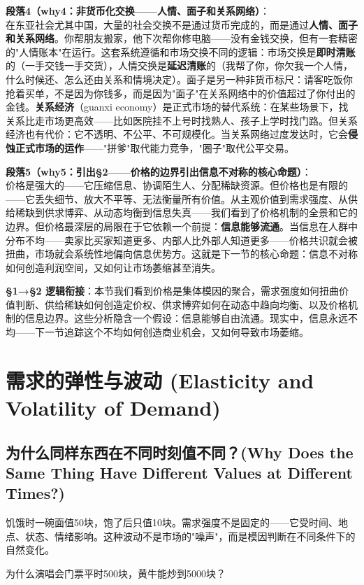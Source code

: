 \documentclass[../main.tex]{subfiles}
\begin{document}
	\textbf{段落4（why4：非货币化交换——人情、面子和关系网络）}：\\
	在东亚社会尤其中国，大量的社会交换不是通过货币完成的，而是通过\textbf{人情、面子和关系网络}。你帮朋友搬家，他下次帮你修电脑——没有金钱交换，但有一套精密的"人情账本"在运行。这套系统遵循和市场交换不同的逻辑：市场交换是\textbf{即时清账}的（一手交钱一手交货），人情交换是\textbf{延迟清账}的（我帮了你，你欠我一个人情，什么时候还、怎么还由关系和情境决定）。面子是另一种非货币标尺：请客吃饭你抢着买单，不是因为你钱多，而是因为"面子"在关系网络中的价值超过了你付出的金钱。\textbf{关系经济}（guanxi economy）是正式市场的替代系统：在某些场景下，找关系比走市场更高效——比如医院挂不上号时找熟人、孩子上学时找门路。但关系经济也有代价：它不透明、不公平、不可规模化。当关系网络过度发达时，它会\textbf{侵蚀正式市场的运作}——"拼爹"取代能力竞争，"圈子"取代公平交易。

	\textbf{段落5（why5：引出§2——价格的边界引出信息不对称的核心命题）}：\\
	价格是强大的——它压缩信息、协调陌生人、分配稀缺资源。但价格也是有限的——它丢失细节、放大不平等、无法衡量所有价值。从主观价值到需求强度、从供给稀缺到供求博弈、从动态均衡到信息失真——我们看到了价格机制的全景和它的边界。但价格最深层的局限在于它依赖一个前提：\textbf{信息能够流通}。当信息在人群中分布不均——卖家比买家知道更多、内部人比外部人知道更多——价格共识就会被扭曲，市场就会系统性地偏向信息优势方。这就是下一节的核心命题：信息不对称如何创造利润空间，又如何让市场萎缩甚至消失。

	\textbf{§1→§2 逻辑衔接}：本节我们看到价格是集体模因的聚合，需求强度如何扭曲价值判断、供给稀缺如何创造定价权、供求博弈如何在动态中趋向均衡、以及价格机制的信息边界。这些分析隐含一个假设：信息能够自由流通。现实中，信息永远不均——下一节追踪这个不均如何创造商业机会，又如何导致市场萎缩。

	\section{需求的弹性与波动 (Elasticity and Volatility of Demand)}

	\subsection{为什么同样东西在不同时刻值不同？(Why Does the Same Thing Have Different Values at Different Times?)}
	\begin{motivation}
		饥饿时一碗面值50块，饱了后只值10块。需求强度不是固定的——它受时间、地点、状态、情绪影响。这种波动不是市场的"噪声"，而是模因判断在不同条件下的自然变化。
	\end{motivation}
	\begin{questionbox}
		为什么演唱会门票平时500块，黄牛能炒到5000块？
	\end{questionbox}
\end{document}
